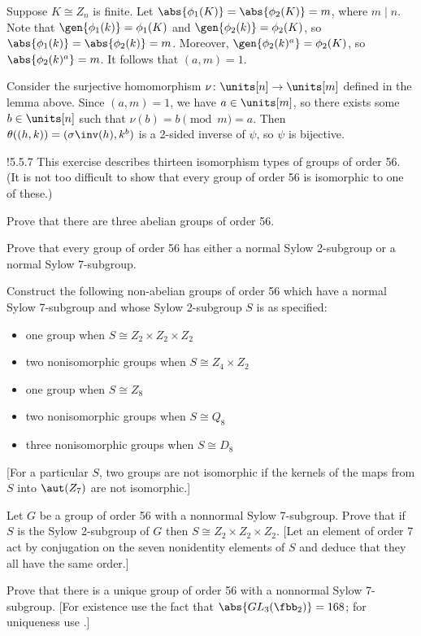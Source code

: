 \begin{sol}
\begin{enumerate}
        Suppose $K \cong Z_n$ is finite.
	Let $\abs{\phi_1(K)} = \abs{\phi_2(K)} = m$, where $m \mid n$.
	Note that $\gen{\phi_1(k)} = \phi_1(K)$ and $\gen{\phi_2(k)} = \phi_2(K)$, so $\abs{\phi_1(k)} = \abs{\phi_2(k)} = m$.
	Moreover, $\gen{\phi_2(k)^a} = \phi_2(K)$, so $\abs{\phi_2(k)^a} = m$.
	It follows that $(a, m) = 1$. 
        
        Consider the surjective homomorphism $\nu \colon \units[n] \to \units[m]$ defined in the lemma above.
	Since $(a, m) = 1$, we have $a \in \units[m]$, so there exists some $b \in \units[n]$ such that $\nu(b) = b \pmod m = a$.
	Then $\theta((h, k)) = (\sigma\inv(h), k^b)$ is a 2-sided inverse of $\psi$, so $\psi$ is bijective. \qedhere
    \end{enumerate}
\end{sol}

\begin{exercise}!{5.5.7}
    This exercise describes thirteen isomorphism types of groups of order 56. (It is not too difficult to show that every group of order 56 is isomorphic to one of these.)
    \begin{subexercises}
        \item Prove that there are three abelian groups of order 56.
        \item Prove that every group of order 56 has either a normal Sylow 2-subgroup or a normal Sylow 7-subgroup.
        \item Construct the following non-abelian groups of order 56 which have a normal Sylow 7-subgroup and whose Sylow 2-subgroup $S$ is as specified:
        \begin{itemize}
            \item one group when $S \cong Z_2 \times Z_2 \times Z_2$
            \item two nonisomorphic groups when $S \cong Z_4 \times Z_2$
            \item one group when $S \cong Z_8$
            \item two nonisomorphic groups when $S \cong Q_8$
            \item three nonisomorphic groups when $S \cong D_8$
        \end{itemize}
        [For a particular $S$, two groups are not isomorphic if the kernels of the maps from $S$ into $\aut(Z_7)$ are not isomorphic.]
        \item Let $G$ be a group of order 56 with a nonnormal Sylow 7-subgroup.
	    Prove that if $S$ is the Sylow 2-subgroup of $G$ then $S \cong Z_2 \times Z_2 \times Z_2$. [Let an element of order 7 act by conjugation on the seven nonidentity elements of $S$ and deduce that they all have the same order.]
        \item Prove that there is a unique group of order 56 with a nonnormal Sylow 7-subgroup. [For existence use the fact that $\abs{GL_3(\fbb_2)} = 168$; for uniqueness use .]
    \end{subexercises}
\end{exercise}

